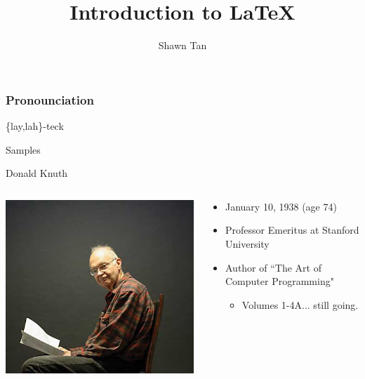 \usepackage{color}
\usepackage{animate}
\usepackage{verbatim}

\title{Introduction to \LaTeX}
\author{Shawn Tan}

\maketitle
\begin{frame}
	\frametitle{Pronounciation}
	\begin{center}	 
	\huge \{lay,lah\}-teck
	\end{center}
\end{frame}
\begin{frame}
	\begin{center}
		\huge Samples
	\end{center}
\end{frame}
\begin{frame}{Donald Knuth}
\begin{columns}
	\begin{column}{0.5\textwidth}
		\begin{center}
		\includegraphics[scale=0.4]{knuth.jpg}
		\end{center}
	\end{column}
	\begin{column}{0.5\textwidth}
		\begin{itemize}
			\item January 10, 1938 (age 74)
			\item Professor Emeritus at Stanford University
			\item Author of ``The Art of Computer Programming"
			\begin{itemize}
				\item Volumes 1-4A... still going.
			\end{itemize}
		\end{itemize}
	\end{column}
\end{columns}
\end{frame}
